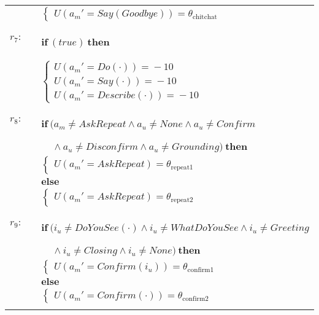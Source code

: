 \begin{footnotesize}
\begin{longtable}{p{2cm}l}
& \;\;\;\;\; $ \begin{cases}U(\mathit{a_m}'\!=\!\mathit{Say(Goodbye)})\!=\!\theta_{\mathrm{chitchat}} \end{cases}$ \\ \\[-1mm]
$r_{7}$: \ \ & $ \textbf{if} \  (\mathit{true}) \  \textbf{then}$ \\ & \;\;\;\;\; $\begin{cases}U(\mathit{a_m}'\!=\!\mathit{Do(\cdot)})\!=\!-10 \\
U(\mathit{a_m}'\!=\!\mathit{Say(\cdot)})\!=\!-10 \\
U(\mathit{a_m}'\!=\!\mathit{Describe(\cdot)})\!=\!-10 \end{cases}$ \\ \\[-1mm]
$r_{8}$: \ \ & $ \textbf{if} \ (\mathit{a_m}\!\neq\!\mathit{AskRepeat} \land \mathit{a_u}\!\neq\!\mathit{None} \land \mathit{a_u}\!\neq\!\mathit{Confirm} $ \\ & $\ \ \ \ \  \land \mathit{a_u}\!\neq\!\mathit{Disconfirm} \land \mathit{a_u}\!\neq\!\mathit{Grounding}) \ \textbf{then} $ \\
 & \;\;\;\;\; $ \begin{cases}U(\mathit{a_m}'\!=\!\mathit{AskRepeat})\!=\!\theta_{\mathrm{repeat1}} \end{cases}$ \vspace{1mm} \\ & $ \textbf{else}$ \\
& \;\;\;\;\; $ \begin{cases}U(\mathit{a_m}'\!=\!\mathit{AskRepeat})\!=\!\theta_{\mathrm{repeat2}} \end{cases}$ \\ \\[-1mm]
$r_{9}$: \ \ & $ \textbf{if} \ (\mathit{i_u}\!\neq\!\mathit{DoYouSee(\cdot)} \land \mathit{i_u}\!\neq\!\mathit{WhatDoYouSee} \land \mathit{i_u}\!\neq\!\mathit{Greeting} $ \\ & $\ \ \ \ \ \land \mathit{i_u}\!\neq\!\mathit{Closing} \land \mathit{i_u}\!\neq\!\mathit{None}) \ \textbf{then} $ \\
 & \;\;\;\;\; $ \begin{cases}U(\mathit{a_m}'\!=\!\mathit{Confirm({i_u})})\!=\!\theta_{\mathrm{confirm1}} \end{cases}$ \vspace{1mm} \\ & $ \textbf{else}$ \\
& \;\;\;\;\; $ \begin{cases}U(\mathit{a_m}'\!=\!\mathit{Confirm(\cdot)})\!=\!\theta_{\mathrm{confirm2}} \end{cases}$ \\ \\[-1mm]

\end{longtable}
\end{footnotesize}
